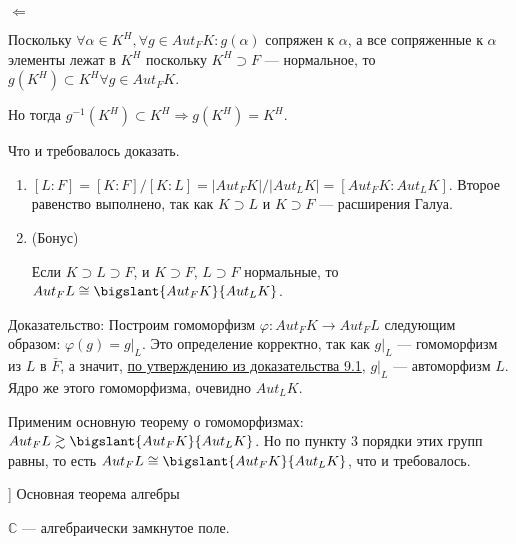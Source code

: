 \begin{solution}
\(\Leftarrow\)

Поскольку \(\forall \alpha \in K^H, \forall g \in Aut_FK: g(\alpha)\) сопряжен к \(\alpha\), а все сопряженные к \(\alpha\) элементы лежат в \(K^H\) поскольку \(K^H \supset F\) --- нормальное, то \(g(K^H) \subset K^H \forall g \in Aut_FK\).

Но тогда \(g^{-1}(K^H) \subset K^H \Rightarrow g(K^H) = K^H\).

Что и требовалось доказать.

\begin{enumerate}
\def\labelenumi{\arabic{enumi})}
\setcounter{enumi}{2}
\item
  \([L : F] = [K : F] / [K : L] = |Aut_FK| / |Aut_LK| = [Aut_FK : Aut_LK]\). Второе равенство выполнено, так как \(K \supset L\) и \(K \supset F\) --- расширения Галуа.
\item
  \hypertarget{9.4.bonus}{(Бонус)}
  Если \(K \supset L \supset F\), и \(K \supset F\), \(L \supset F\) нормальные, то \(Aut_FL \cong \bigslant{Aut_FK}{Aut_LK}\).
\end{enumerate}

Доказательство: Построим гомоморфизм \(\varphi: Aut_FK \to Aut_FL\) следующим образом: \(\varphi(g) = g|_L\). Это определение корректно, так как \(g|_L\) --- гомоморфизм из \(L\) в \(\bar{F}\), а значит, \hyperlink{9.1.statement.2}{по утверждению из доказательства 9.1}, \(g|_L\) --- автоморфизм \(L\). Ядро же этого гомоморфизма, очевидно \(Aut_LK\).

Применим основную теорему о гомоморфизмах:
\(Aut_FL \gtrsim \bigslant{Aut_FK}{Aut_LK}\). Но по пункту 3 порядки этих групп равны, то есть \(Aut_FL \cong \bigslant{Aut_FK}{Aut_LK}\), что и требовалось.
\end{solution}

\begin{problem}[10 [Каргальцев]]
Основная теорема алгебры

$\mathbb{C}$ --- алгебраически замкнутое поле.
\end{problem}


